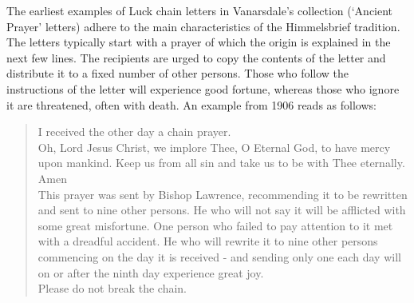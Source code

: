 The earliest examples of Luck chain letters in Vanarsdale's collection (`Ancient Prayer' letters) adhere to the main characteristics of the Himmelsbrief tradition. The letters typically start with a prayer of which the origin is explained in the next few lines. The recipients are urged to copy the contents of the letter and distribute it to a fixed number of other persons. Those who follow the instructions of the letter will experience good fortune, whereas those who ignore it are threatened, often with death. An example from 1906 reads as follows:
\begin{quote}
{\it

\noindent I received the other day a chain prayer.\\

\noindent Oh, Lord Jesus Christ, we implore Thee, O Eternal God, to have mercy upon mankind.  Keep us from all sin and take us to be with Thee eternally. Amen\\

\noindent This prayer was sent by Bishop Lawrence, recommending it to be rewritten and sent to nine other persons. He who will not say it will be afflicted with some great misfortune. One person who failed to pay attention to it met with a dreadful accident. He who will rewrite it to nine other persons commencing on the day it is received - and sending only one each day will on or after the ninth day experience great joy.\\

\noindent Please do not break the chain.}\autocite[Taken from \texttt{le1906-01-06\_ap!\_lawrence\_q9.htm} in][]{vanarsdale_archive:2015}
\end{quote}

